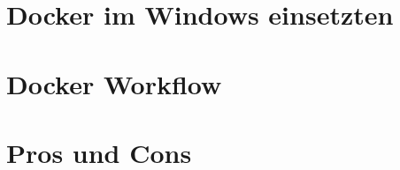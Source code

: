 \documentclass[
10pt, %
a4paper, %
BCOR15mm, %
DIV14, %
footsepline = false, %
headsepline, %
oneside,
openright,
parskip=half, %
abstracton, %
listof=totocnumbered, %
bibliography=totocnumbered %
]{scrreprt}
\begin{document}


\cleardoublepage


\chapter{Docker im Windows einsetzten}\label{chapter:Docker im Windows einsetzten}



\cleardoublepage

  
\chapter{Docker Workflow}\label{chapter:DockerWorkflow}
  


\cleardoublepage


\chapter{Pros und Cons}\label{chapter:ProsUndCons}



\cleardoublepage


\appendix


\end{document}
